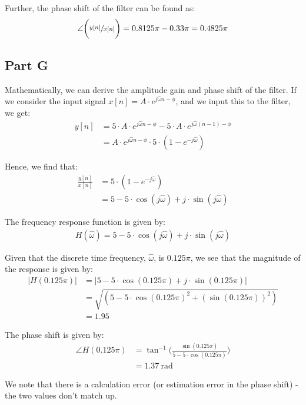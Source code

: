 \documentclass{article}
\begin{document}
Further, the phase shift of the filter can be found as:
\begin{align*}
	\angle \bigg(\sfrac{y[n]}{x[n]}\bigg) = 0.8125 \pi - 0.33 \pi = 0.4825 \pi
\end{align*}

\subsection{Part G}
Mathematically, we can derive the amplitude gain and phase shift of the filter. If we consider the input signal $x[n] = A \cdot e^{j \hat{\omega}n - \phi}$, and we input this to the filter, we get:
\begin{align*}
	y[n] 	&= 5 \cdot A \cdot e^{j \hat{\omega}n - \phi} - 5 \cdot A \cdot e^{j \hat{\omega}(n-1) - \phi}\\
			&= A \cdot e^{j \hat{\omega}n - \phi} \cdot 5 \cdot (1 - e^{-j \hat{\omega}})
\end{align*}

Hence, we find that:
\begin{align*}
	\frac{y[n]}{x[n]} 	&= 5 \cdot (1 - e^{-j \hat{\omega}})\\
						&= 5 - 5 \cdot \cos(j \hat{\omega}) + j \cdot \sin(j \hat{\omega})
\end{align*}

The frequency response function is given by:
\begin{align*}
	H(\hat{\omega}) = 5 - 5 \cdot \cos(j \hat{\omega}) + j \cdot \sin(j \hat{\omega})
\end{align*}

Given that the discrete time frequency, $\hat{\omega}$, is $0.125 \pi$, we see that the magnitude of the response is given by:
\begin{align*}
	|H(0.125 \pi)| 	&= |5 - 5 \cdot \cos(0.125 \pi) + j \cdot \sin(0.125 \pi)|\\
					&= \sqrt{(5 - 5 \cdot \cos(0.125 \pi)^2 + (\sin(0.125 \pi))^2)}\\
					&= 1.95
\end{align*}

The phase shift is given by:
\begin{align*}
	\angle H(0.125 \pi) &= \tan^{-1}\bigg(\frac{\sin(0.125 \pi)}{5 - 5 \cdot \cos(0.125 \pi)}\bigg)\\
						&= 1.37 \ \si{\radian}
\end{align*}

We note that there is a calculation error (or estimation error in the phase shift) - the two values don't match up.
\end{document}
